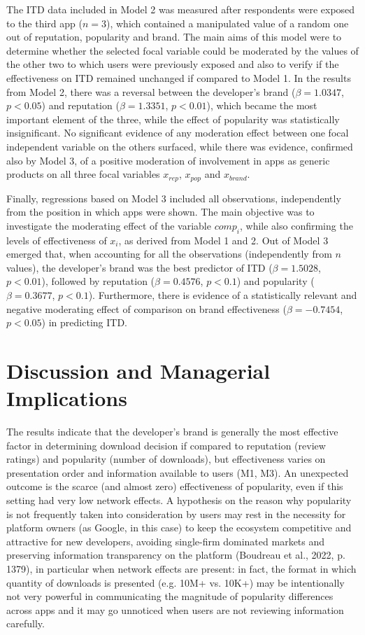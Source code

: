 The ITD data included in Model 2 was measured after respondents were exposed to the third app ($n=3$), which contained a manipulated value of a random one out of reputation, popularity and brand. The main aims of this model were to determine whether the selected focal variable could be moderated by the values of the other two to which users were previously exposed and also to verify if the effectiveness on ITD remained unchanged if compared to Model 1. In the results from Model 2, there was a reversal between the developer's brand ($\beta=1.0347$, $p<0.05$) and reputation ($\beta=1.3351$, $p<0.01$), which became the most important element of the three, while the effect of popularity was statistically insignificant. No significant evidence of any moderation effect between one focal independent variable on the others surfaced, while there was evidence, confirmed also by Model 3, of a positive moderation of involvement in apps as generic products on all three focal variables $x_{rep}$, $x_{pop}$ and $x_{brand}$.

Finally, regressions based on Model 3 included all observations, independently from the position in which apps were shown. The main objective was to investigate the moderating effect of the variable $comp_i$, while also confirming the levels of effectiveness of $x_i$, as derived from Model 1 and 2. Out of Model 3 emerged that, when accounting for all the observations (independently from $n$ values), the developer's brand was the best predictor of ITD ($\beta=1.5028$, $p<0.01$), followed by reputation ($\beta=0.4576$, $p<0.1$) and popularity ($\beta=0.3677$, $p<0.1$). Furthermore, there is evidence of a statistically relevant and negative moderating effect of comparison on brand effectiveness ($\beta=-0.7454$, $p<0.05$) in predicting ITD. 


\section{Discussion and Managerial Implications}


The results indicate that the developer's brand is generally the most effective factor in determining download decision if compared to reputation (review ratings) and popularity (number of downloads), but effectiveness varies on presentation order and information available to users (M1, M3). An unexpected outcome is the scarce (and almost zero) effectiveness of popularity, even if this setting had very low network effects. A hypothesis on the reason why popularity is not frequently taken into consideration by users may rest in the necessity for platform owners (as Google, in this case) to keep the ecosystem competitive and attractive for new developers, avoiding single-firm dominated markets and preserving information transparency on the platform (Boudreau et al., 2022, p. 1379), in particular when network effects are present: in fact, the format in which quantity of downloads is presented (e.g. 10M+ vs. 10K+) may be intentionally not very powerful in communicating the magnitude of popularity differences across apps and it may go unnoticed when users are not reviewing information carefully.

